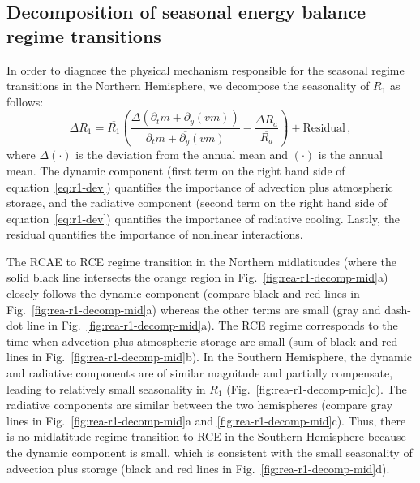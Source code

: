 \documentclass{ametsocV5}
\begin{document}
    \subsection{Decomposition of seasonal energy balance regime transitions}
    In order to diagnose the physical mechanism responsible for the seasonal regime transitions in the Northern Hemisphere, we decompose the seasonality of $R_1$ as follows:
    \begin{equation}\label{eq:r1-dev}
      \Delta R_1 = \overline{R_1}\left( \frac{\Delta(\partial_t m + \partial_y (vm))}{\overline{\partial_t m + \partial_y (vm)}}  - \frac{\Delta R_a }{\overline{R_a}}\right) + \mathrm{Residual} \, ,
    \end{equation}
    where $\Delta(\cdot)$ is the deviation from the annual mean and $\overline{(\cdot)}$ is the annual mean. The dynamic component (first term on the right hand side of equation~\ref{eq:r1-dev}) quantifies the importance of advection plus atmospheric storage, and the radiative component (second term on the right hand side of equation~\ref{eq:r1-dev}) quantifies the importance of radiative cooling. Lastly, the residual quantifies the importance of nonlinear interactions.

    The RCAE to RCE regime transition in the Northern midlatitudes (where the solid black line intersects the orange region in Fig.~\ref{fig:rea-r1-decomp-mid}a) closely follows the dynamic component (compare black and red lines in Fig.~\ref{fig:rea-r1-decomp-mid}a) whereas the other terms are small (gray and dash-dot line in Fig.~\ref{fig:rea-r1-decomp-mid}a). The RCE regime corresponds to the time when advection plus atmospheric storage are small (sum of black and red lines in Fig.~\ref{fig:rea-r1-decomp-mid}b). In the Southern Hemisphere, the dynamic and radiative components are of similar magnitude and partially compensate, leading to relatively small seasonality in $R_1$ (Fig.~\ref{fig:rea-r1-decomp-mid}c). The radiative components are similar between the two hemispheres (compare gray lines in Fig.~\ref{fig:rea-r1-decomp-mid}a and \ref{fig:rea-r1-decomp-mid}c). Thus, there is no midlatitude regime transition to RCE in the Southern Hemisphere because the dynamic component is small, which is consistent with the small seasonality of advection plus storage (black and red lines in Fig.~\ref{fig:rea-r1-decomp-mid}d).
\end{document}
